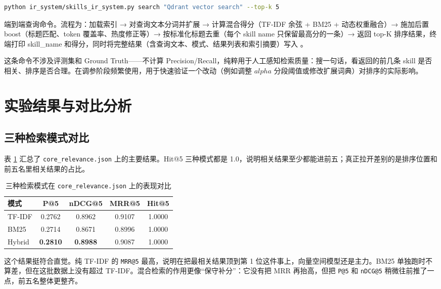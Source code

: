 \begin{lstlisting}[language=bash]
python ir_system/skills_ir_system.py search "Qdrant vector search" --top-k 5
\end{lstlisting}

端到端查询命令。流程为：加载索引 → 对查询文本分词并扩展 → 计算混合得分（TF-IDF 余弦 + BM25 + 动态权重融合）→ 施加后置 boost（标题匹配、token 覆盖率、热度修正等）→ 按标准化标题去重（每个 skill name 只保留最高分的一条）→ 返回 top-K 排序结果，终端打印 skill\_name 和得分，同时将完整结果（含查询文本、模式、结果列表和索引摘要）写入 。

这条命令不涉及评测集和 Ground Truth——不计算 Precision/Recall，纯粹用于人工感知检索质量：搜一句话，看返回的前几条 skill 是否相关、排序是否合理。在调参阶段频繁使用，用于快速验证一个改动（例如调整 $alpha$ 分段阈值或修改扩展词典）对排序的实际影响。

\section{实验结果与对比分析}
\subsection{三种检索模式对比}
表 \ref{tab:mode-compare} 汇总了 \texttt{core\_relevance.json} 上的主要结果。Hit@5 三种模式都是 1.0，说明相关结果至少都能进前五；真正拉开差别的是排序位置和前五名里相关结果的占比。

\begin{table}[H]
\centering
\caption{三种检索模式在 \texttt{core\_relevance.json} 上的表现对比}
\label{tab:mode-compare}
\begin{tabular}{lcccc}
\toprule
模式 & P@5 & nDCG@5 & MRR@5 & Hit@5 \\
\midrule
TF-IDF & 0.2762 & 0.8962 & 0.9107 & 1.0000 \\
BM25 & 0.2714 & 0.8671 & 0.8996 & 1.0000 \\
Hybrid & \textbf{0.2810} & \textbf{0.8988} & 0.9087 & 1.0000 \\
\bottomrule
\end{tabular}
\end{table}

这个结果挺符合直觉。纯 TF-IDF 的 \texttt{MRR@5} 最高，说明在把最相关结果顶到第 1 位这件事上，向量空间模型还是主力。BM25 单独跑时不算差，但在这批数据上没有超过 TF-IDF。混合检索的作用更像“保守补分”：它没有把 MRR 再抬高，但把 \texttt{P@5} 和 \texttt{nDCG@5} 稍微往前推了一点，前五名整体更整齐。

